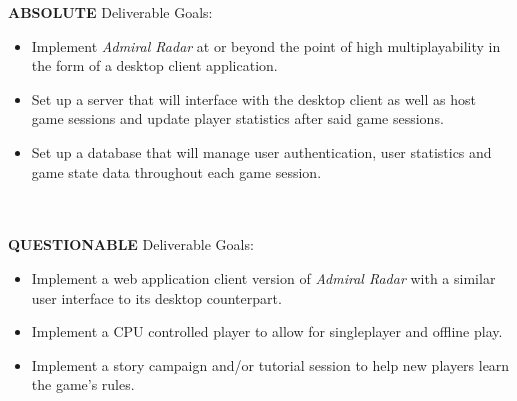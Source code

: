 \textbf{ABSOLUTE} Deliverable Goals:
  \begin{itemize} \\
    \item Implement \textit{Admiral Radar} at or beyond the point of high multiplayability in the form of a desktop client application.
    \item Set up a server that will interface with the desktop client as well as host game sessions and update player statistics after said game sessions.
    \item Set up a database that will manage user authentication, user statistics and game state data throughout each game session.
  \end{itemize}
\\\\
\textbf{QUESTIONABLE} Deliverable Goals:
  \begin{itemize} \\
    \item Implement a web application client version of \textit{Admiral Radar} with a similar user interface to its desktop counterpart.
    \item Implement a CPU controlled player to allow for singleplayer and offline play.
    \item Implement a story campaign and/or tutorial session to help new players learn the game’s rules.
  \end{itemize}
